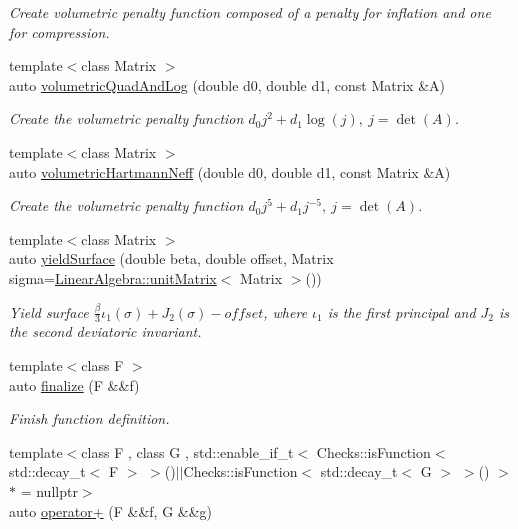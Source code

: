 \begin{DoxyCompactItemize}
\begin{DoxyCompactList}\small\item\em Create volumetric penalty function composed of a penalty for inflation and one for compression. \end{DoxyCompactList}\item 
{\footnotesize template$<$class Matrix $>$ }\\auto \hyperlink{namespaceFunG_aaf30b9c36ed86e01b94f6b7c1d95cae8}{volumetric\+Quad\+And\+Log} (double d0, double d1, const Matrix \&A)
\begin{DoxyCompactList}\small\item\em Create the volumetric penalty function $ d_0 j^2 + d_1 \log(j),\ j=\det(A) $. \end{DoxyCompactList}\item 
{\footnotesize template$<$class Matrix $>$ }\\auto \hyperlink{namespaceFunG_adf4be5df85ea9df10cc9e11c11aaeb7b}{volumetric\+Hartmann\+Neff} (double d0, double d1, const Matrix \&A)
\begin{DoxyCompactList}\small\item\em Create the volumetric penalty function $ d_0 j^5 + d_1 j^{-5},\ j=\det(A) $. \end{DoxyCompactList}\item 
{\footnotesize template$<$class Matrix $>$ }\\auto \hyperlink{namespaceFunG_a4784211358c877f05ad9426850303273}{yield\+Surface} (double beta, double offset, Matrix sigma=\hyperlink{group__LinearAlgebraGroup_ga88a596b8526c0ed98ce241244fb85948}{Linear\+Algebra\+::unit\+Matrix}$<$ Matrix $>$())
\begin{DoxyCompactList}\small\item\em Yield surface $ \frac{\beta}{3}\iota_1(\sigma) + J_2(\sigma)-offset $, where $\iota_1$ is the first principal and $J_2$ is the second deviatoric invariant. \end{DoxyCompactList}\item 
{\footnotesize template$<$class F $>$ }\\auto \hyperlink{namespaceFunG_ac59f2ececc3cd451860776320a4a93d5}{finalize} (F \&\&f)
\begin{DoxyCompactList}\small\item\em Finish function definition. \end{DoxyCompactList}\item 
{\footnotesize template$<$class F , class G , std\+::enable\+\_\+if\+\_\+t$<$ Checks\+::is\+Function$<$ std\+::decay\+\_\+t$<$ F $>$ $>$()$\vert$$\vert$\+Checks\+::is\+Function$<$ std\+::decay\+\_\+t$<$ G $>$ $>$() $>$ $\ast$  = nullptr$>$ }\\auto \hyperlink{namespaceFunG_a24bb5d609b022030afda2d8589cf5509}{operator+} (F \&\&f, G \&\&g)

\end{DoxyCompactItemize}
